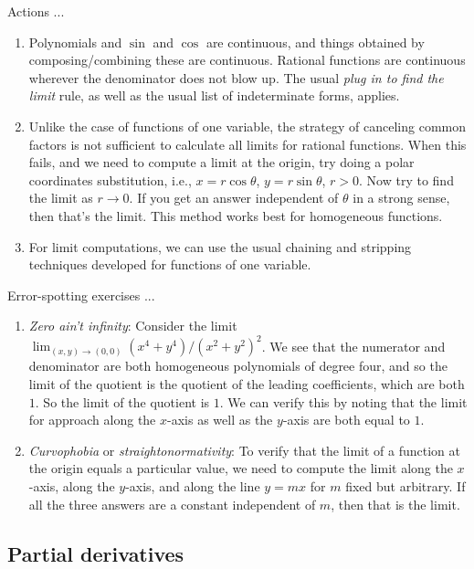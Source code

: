 \documentclass[10pt]{amsart}
\begin{document}
Actions ...

\begin{enumerate}
\item Polynomials and $\sin$ and $\cos$ are continuous, and things
  obtained by composing/combining these are continuous. Rational
  functions are continuous wherever the denominator does not blow
  up. The usual {\em plug in to find the limit} rule, as well as the
  usual list of indeterminate forms, applies.
\item Unlike the case of functions of one variable, the strategy of
  canceling common factors is not sufficient to calculate all limits
  for rational functions. When this fails, and we need to compute a
  limit at the origin, try doing a polar coordinates substitution,
  i.e., $x = r\cos \theta$, $y = r \sin \theta$, $r > 0$. Now try to
  find the limit as $r \to 0$. If you get an answer independent of
  $\theta$ in a strong sense, then that's the limit. This method works
  best for homogeneous functions.
\item For limit computations, we can use the usual chaining and
  stripping techniques developed for functions of one variable.
\end{enumerate}

Error-spotting exercises ...

\begin{enumerate}
\item {\em Zero ain't infinity}: Consider the limit $\lim_{(x,y) \to
  (0,0)} (x^4 + y^4)/(x^2 + y^2)^2$. We see that the numerator and
  denominator are both homogeneous polynomials of degree four, and so
  the limit of the quotient is the quotient of the leading
  coefficients, which are both $1$. So the limit of the quotient is
  $1$. We can verify this by noting that the limit for approach along
  the $x$-axis as well as the $y$-axis are both equal to $1$.
\item {\em Curvophobia} or {\em straightonormativity}: To verify that
  the limit of a function at the origin equals a particular value, we
  need to compute the limit along the $x$-axis, along the $y$-axis,
  and along the line $y = mx$ for $m$ fixed but arbitrary. If all the
  three answers are a constant independent of $m$, then that is the
  limit.
\end{enumerate}

\subsection{Partial derivatives}
\end{document}
